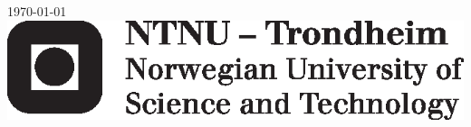 \begin{titlepage}

{\large \today}\\[3cm] %


\includegraphics[scale=0.5]{./gfx/ntnu_logo.eps}\\[1cm] %


\vfill %

\end{titlepage}
